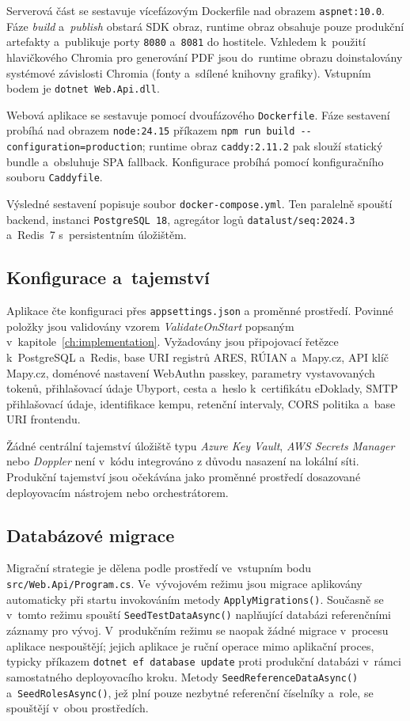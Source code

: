 Serverová část se sestavuje vícefázovým Dockerfile nad obrazem \texttt{aspnet:10.0}.
Fáze \emph{build} a~\emph{publish} obstará SDK obraz, runtime obraz obsahuje pouze produkční artefakty a~publikuje  porty \texttt{8080} a~\texttt{8081} do hostitele.
Vzhledem k~použití hlavičkového Chromia pro generování PDF jsou do~runtime obrazu doinstalovány systémové závislosti Chromia (fonty a~sdílené knihovny grafiky).
Vstupním bodem je \texttt{dotnet Web.Api.dll}.

Webová aplikace se sestavuje pomocí dvoufázového \texttt{Dockerfile}.
Fáze sestavení probíhá nad obrazem \texttt{node:24.15} příkazem \texttt{npm run build -{}-configuration=production}; runtime obraz \texttt{caddy:2.11.2} pak slouží statický bundle a~obsluhuje SPA fallback.
Konfigurace probíhá pomocí konfiguračního souboru \texttt{Caddyfile}.

Výsledné sestavení popisuje soubor \texttt{docker-compose.yml}.
Ten paralelně spouští backend, instanci \texttt{PostgreSQL~18}, agregátor logů \texttt{datalust/seq:2024.3} a~Redis~7 s~persistentním úložištěm.

\subsection{Konfigurace a~tajemství}
\label{subsec:deploy-config}

Aplikace čte konfiguraci přes \texttt{appsettings.json} a proměnné prostředí.
Povinné položky jsou validovány vzorem \emph{ValidateOnStart} popsaným v~kapitole~\ref{ch:implementation}.
Vyžadovány jsou připojovací řetězce k~PostgreSQL a~Redis, base URI registrů ARES, RÚIAN a~Mapy.cz, API klíč Mapy.cz, doménové nastavení WebAuthn passkey, parametry vystavovaných tokenů, přihlašovací údaje Ubyport, cesta a~heslo k~certifikátu eDoklady, SMTP přihlašovací údaje, identifikace kempu, retenční intervaly, CORS politika a~base URI frontendu.

Žádné centrální tajemství úložiště typu \emph{Azure Key Vault}, \emph{AWS Secrets Manager} nebo \emph{Doppler} není v~kódu integrováno z důvodu nasazení na lokální síti.
Produkční tajemství jsou očekávána jako proměnné prostředí dosazované deployovacím nástrojem nebo orchestrátorem.

\subsection{Databázové migrace}
\label{subsec:deploy-migrations}

Migrační strategie je dělena podle prostředí ve~vstupním bodu \texttt{src/Web.Api/Program.cs}.
Ve~vývojovém režimu jsou migrace aplikovány automaticky při startu invokováním metody \texttt{ApplyMigrations()}.
Současně se v~tomto režimu spouští \texttt{SeedTestDataAsync()} naplňující databázi referenčními záznamy pro vývoj.
V~produkčním režimu se naopak žádné migrace v~procesu aplikace nespouštějí; jejich aplikace je ruční operace mimo aplikační proces, typicky příkazem \texttt{dotnet~ef~database~update} proti produkční databázi v~rámci samostatného deployovacího kroku.
Metody \texttt{SeedReferenceDataAsync()} a~\texttt{SeedRolesAsync()}, jež plní pouze nezbytné referenční číselníky a~role, se spouštějí v~obou prostředích.

